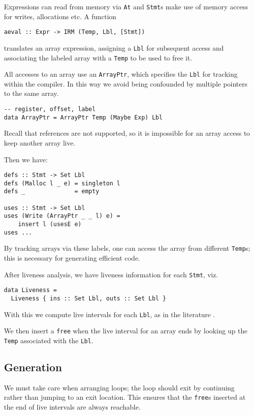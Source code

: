 \documentclass[sigplan,screen,anonymous]{acmart}
\begin{document}
Expressions can read from memory via {\tt At} and {\tt Stmt}s make use of memory access for writes, allocations etc. A function

\begin{verbatim}
aeval :: Expr -> IRM (Temp, Lbl, [Stmt])
\end{verbatim}
translates an array expression, assigning a {\tt Lbl} for subsequent access and associating the labeled array with a {\tt Temp} to be used to free it.

All accesses to an array use an {\tt ArrayPtr}, which specifies the {\tt Lbl} for tracking within the compiler. In this way we avoid being confounded by multiple pointers to the same array. 

\begin{verbatim}
-- register, offset, label
data ArrayPtr = ArrayPtr Temp (Maybe Exp) Lbl
\end{verbatim}

Recall that references are not supported, so it is impossible for an array access to keep another array live.

Then we have:

\begin{verbatim}
defs :: Stmt -> Set Lbl
defs (Malloc l _ e) = singleton l
defs _              = empty

uses :: Stmt -> Set Lbl
uses (Write (ArrayPtr _ _ l) e) =
    insert l (usesE e)
uses ...
\end{verbatim}

By tracking arrays via these labels, one can access the array from different {\tt Temp}s; this is necessary for generating efficient code.

After liveness analysis, we have liveness information for each {\tt Stmt}, viz.

\begin{verbatim}
data Liveness =
  Liveness { ins :: Set Lbl, outs :: Set Lbl }
\end{verbatim}

With this we compute live intervals for each {\tt Lbl}, as in the literature \cite{poletto1999}.

We then insert a {\tt free} when the live interval for an array ends by looking up the {\tt Temp} associated with the {\tt Lbl}.

\subsection{Generation}

We must take care when arranging loops; the loop should exit by continuing rather than jumping to an exit location. This ensures that the {\tt free}s inserted at the end of live intervals are always reachable.
\end{document}
